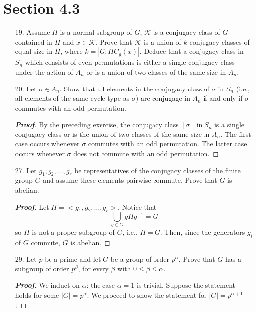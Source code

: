 \documentclass[12pt,leqno]{book}
\theoremstyle{definition}
\newenvironment{Proof}{\begin{proof}[\textnormal{\textbf{Proof}}]}{\end{proof}}
\begin{document}
\section*{Section 4.3}
\begin{enumerate}
 \item [19.] Assume $H$ is a normal subgroup of $G$, $\mathcal{K}$ is a conjugacy class of $G$ contained in $H$ and $x\in\mathcal{K}$. Prove that $\mathcal{K}$ is a union of $k$ conjugacy classes of equal size in $H$, where $k=|G:HC_g(x)|$. Deduce that a conjugacy class in $S_n$ which consists of even permutations is either a single conjugacy class under the action of $A_n$ or is a union of two classes of the same size in $A_n$.

 \item [20.] Let $\sigma\in A_n$. Show that all elements in the conjugacy class of $\sigma$ in $S_n$ (i.e., all elements of the same cycle type as $\sigma$) are conjugage in $A_n$ if and only if $\sigma$ commutes with an odd permutation.

\begin{Proof}
By the preceding exercise, the conjugacy class $[\sigma]$ in $S_n$ is a single conjugacy class or is the union of two classes of the same size in $A_n$. The first case occurs whenever $\sigma$ commutes with an odd permutation. The latter case occurs whenever $\sigma$ does not commute with an odd permutation.
 \end{Proof}

 \item [27.] Let $g_1,g_2,\hdots, g_r$ be representatives of the conjugacy classes of the finite group $G$ and assume these elements pairwise commute. Prove that $G$ is abelian.

\begin{Proof}
 Let $H=<g_1,g_2,\hdots,g_r>$. Notice that \[\bigcup_{g\in G}gHg^{-1}=G\] so $H$ is not a proper subgroup of $G$, i.e., $H=G$. Then, since the generators $g_i$ of $G$ commute, $G$ is abelian.
\end{Proof}

 \item [29.] Let $p$ be a prime and let $G$ be a group of order $p^{\alpha}$. Prove that $G$ has a subgroup of order $p^{\beta}$, for every $\beta$ with $0\leq\beta\leq\alpha$. 
\begin{Proof}
 We induct on $\alpha$: the case $\alpha=1$ is trivial. Suppose the statement holds for some $|G|=p^{\alpha}$. We proceed to show the statement for $|G|=p^{\alpha+1}$:


\end{Proof}
\end{enumerate}
\end{document}
